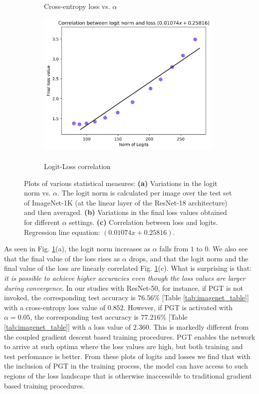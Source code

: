\documentclass[runningheads]{llncs}
\begin{document}
\begin{figure}[!bp]
\begin{subfigure}{0.33\textwidth}
\caption{\\Cross-entropy loss vs. $\alpha$}
\end{subfigure}%
\begin{subfigure}{0.33\textwidth}
\centering
\includegraphics[width=0.98\textwidth]{logit_vs_loss}
\caption{\\Logit-Loss correlation}
\end{subfigure}
\caption{ Plots of various statistical measures: \textbf{(a)} Variations in the logit
norm vs. $\alpha$. The logit norm is calculated per image over the test set of
ImageNet-1K (at the linear layer of the ResNet-18 architecture) and then averaged.
\textbf{(b)} Variations in the final loss values obtained for different $\alpha$
settings. \textbf{(c)} Correlation between loss and logits. Regression line equation:
$(0.01074 x + 0.25816)$. }
\label{fig:stats}
\end{figure}





As seen in Fig. \ref{fig:stats}(a), the logit norm increases as $\alpha$ falls from $1$
to $0$. We also see that the final value of the loss rises as $\alpha$ drops, and that
the logit norm and the final value of the loss are linearly correlated Fig.
\ref{fig:stats}(c). What is surprising is that: \textit{it is possible to achieve higher
accuracies even though the loss values are larger during convergence}. In our studies
with ResNet-50, for instance, if PGT is not invoked, the corresponding test accuracy is
$76.56\%$ [Table \ref{tab:imagenet_table}] with a cross-entropy loss value of $0.852$.
However, if PGT is activated with $\alpha=0.05$, the corresponding test accuracy is
$77.216\%$ [Table \ref{tab:imagenet_table}] with a loss value of $2.360$. This is
markedly different from the coupled gradient descent based training procedures. PGT
enables the network to arrive at such optima where the loss values are high, but both
training and test perfomance is better. From these plots of logits and losses we find
that with the inclusion of PGT in the training process, the model can have access to
such regions of the loss landscape that is otherwise inaccessible to traditional
gradient based training procedures.
\end{document}
